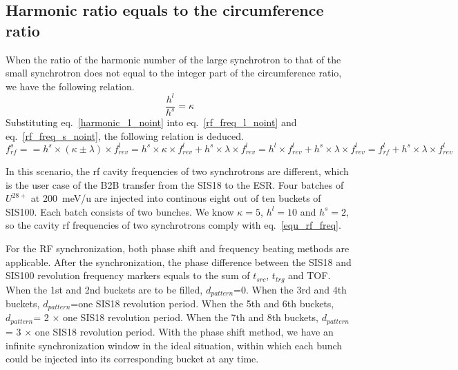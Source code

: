 \subsection{Harmonic ratio equals to the circumference ratio}
When the ratio of the harmonic number of the large synchrotron to that of the small synchrotron does not equal to the integer part of the circumference ratio, we have the following relation.
\begin{equation}
\frac {h^{l}}{h^{s}}= \kappa  \label{harmonic_1_noint}
\end{equation}
Substituting eq.~\ref{harmonic_1_noint} into eq.~\ref{rf_freq_l_noint} and eq.~\ref{rf_freq_s_noint}, the following relation is deduced. 
\begin{equation} 
f_{rf}^{s}= =h^s \times (\kappa\pm \lambda) \times f_{rev}^{l} =h^s \times \kappa \times f_{rev}^{l}+h^s \times \lambda \times f_{rev}^{l}=h^l\times f_{rev}^{l} +h^s \times \lambda \times f_{rev}^{l}= f_{rf}^{l}+h^s \times \lambda \times f_{rev}^{l}\label{equ_rf_freq_noint}
\end{equation}

In this scenario, the rf cavity frequencies of two synchrotrons are different, which is the user case of the B2B transfer from the SIS18 to the ESR. Four batches of $U^{28+}$ at \SI{200}{meV/\atomicmassunit} are injected into continous eight out of ten buckets of SIS100. Each batch consists of two bunches. We know $\kappa=5$, $h^l=10$ and $h^s=2$, so the cavity rf frequencies of two synchrotrons comply with eq.~\ref{equ_rf_freq}.

For the RF synchronization, both phase shift and frequency beating methods are applicable. After the synchronization, the phase difference between the SIS18 and SIS100 revolution frequency markers equals to the sum of $t_{src}$, $t_{trg}$ and TOF. When the 1st and 2nd buckets are to be filled, $d_{pattern}$=0. When the 3rd and 4th buckets, $d_{pattern}$=one SIS18 revolution period. When the 5th and 6th buckets, $d_{pattern}$= 2 $\times$ one SIS18 revolution period. When the 7th and 8th buckets, $d_{pattern}$= 3 $\times$ one SIS18 revolution period.  With the phase shift method, we have an infinite synchronization window in the ideal situation, within which each bunch could be injected into its corresponding bucket at any time.

